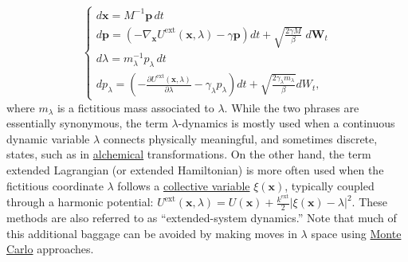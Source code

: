 \documentclass[9pt,review]{livecoms}
\newcommand{\vx}{\mathbf{x}}
\newcommand{\vp}{\mathbf{p}}
\begin{document}
\begin{equation}
\left\{
\begin{array}{ll}
d\vx = M^{-1} \vp \, dt\\
d\vp = \left(-\nabla_\vx U^\text{ext}(\vx,  \lambda) - \gamma \vp \right) dt
    + \sqrt{ \frac{2 \gamma M}{\beta}} \; d\mathbf{W}_t\\
d\lambda = m_\lambda^{-1} p_\lambda \, dt \\
dp_\lambda = \left(-\frac{\partial U^\text{ext}(\vx, \lambda)}{\partial \lambda} - \gamma_\lambda p_\lambda \right) dt
    + \sqrt{ \frac{2 \gamma_\lambda m_\lambda}{ \beta }} dW_t,
\end{array}
\right.
\end{equation}
where $m_\lambda$ is a fictitious mass associated to $\lambda$.
While the two phrases are essentially synonymous, the term $\lambda$-dynamics is mostly used when a continuous dynamic variable $\lambda$ connects physically meaningful, and sometimes discrete, states, such as in \hyperlink{ref:Alchemical} {alchemical} transformations.
On the other hand, the term extended Lagrangian (or extended Hamiltonian) is more often used when the fictitious coordinate $\lambda$ follows a \hyperlink{ref:CV} {collective variable} $\xi(\vx)$, typically coupled through a harmonic potential: $U^\text{ext}(\vx, \lambda) = U(\vx) + \frac{k^\mathrm{ext}}{2}|\xi(\vx)-\lambda|^2$.
These methods are also referred to as ``extended-system dynamics.''  Note that much of this additional baggage can be avoided by making moves in $\lambda$ space using \hyperlink{ref:MetropolisMonteCarlo}{Monte Carlo} approaches.
\end{document}
